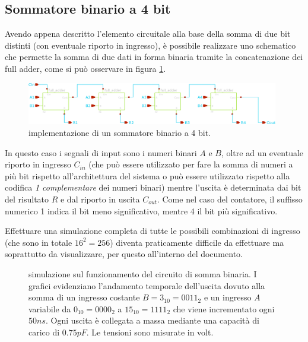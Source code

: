 	
\subsection*{Sommatore binario a 4 bit}
	Avendo appena descritto l'elemento circuitale alla base della somma di due bit distinti (con eventuale riporto in ingresso), è possibile realizzare uno schematico che permette la somma di due dati in forma binaria tramite la concatenazione dei full adder, come si può osservare in figura \ref{fig:add:sch}.
	
	\begin{figure}[bht]
		\centering
		\includegraphics[width=11cm]{Immagini/4bitadder}
		\caption{implementazione di un sommatore binario a 4 bit.}
		\label{fig:add:sch}
	\end{figure}
	
	In questo caso i segnali di input sono i numeri binari $A$ e $B$, oltre ad un eventuale riporto in ingresso $C_{in}$ (che può essere utilizzato per fare la somma di numeri a più bit rispetto all'architettura del sistema o può essere utilizzato rispetto alla codifica \textit{1 complementare} dei numeri binari) mentre l'uscita è determinata dai bit del risultato $R$ e dal riporto in uscita $C_{out}$. Come nel caso del contatore, il suffisso numerico 1 indica il bit meno significativo, mentre 4 il bit più significativo.
	
	Effettuare una simulazione completa di tutte le possibili combinazioni di ingresso (che sono in totale $16^2=256$) diventa praticamente difficile da effettuare ma soprattutto da visualizzare, per questo all'interno del documento.

	\begin{figure}[bht]
		\centering
		
		\caption{simulazione sul funzionamento del circuito di somma binaria. I grafici evidenziano l'andamento temporale dell'uscita dovuto alla somma di un ingresso costante $B=3_{10}=0011_{2}$ e un ingresso $A$ variabile da $0_{10}=0000_2$ a $15_{10}=1111_2$ che viene incrementato ogni $50ns$. Ogni uscita è collegata a massa mediante una capacità di carico di $0.75pF$. Le tensioni sono misurate in volt. }
		\label{fig:add:sim}
	\end{figure}
	
